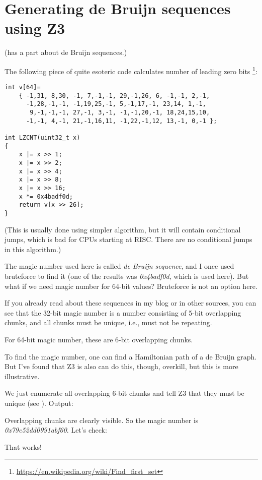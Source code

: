 \section{Generating de Bruijn sequences using Z3}
\label{DeBruijnZ3}

(\MathForProg has a part about de Bruijn sequences.)

\renewcommand{\CURPATH}{equations/de_bruijn_SMT}

The following piece of quite esoteric code calculates number of leading zero bits
\footnote{\url{https://en.wikipedia.org/wiki/Find_first_set}}:

\begin{lstlisting}
int v[64]=
	{ -1,31, 8,30, -1, 7,-1,-1, 29,-1,26, 6, -1,-1, 2,-1,
	  -1,28,-1,-1, -1,19,25,-1, 5,-1,17,-1, 23,14, 1,-1,
	   9,-1,-1,-1, 27,-1, 3,-1, -1,-1,20,-1, 18,24,15,10,
	  -1,-1, 4,-1, 21,-1,16,11, -1,22,-1,12, 13,-1, 0,-1 };

int LZCNT(uint32_t x)
{
    x |= x >> 1;
    x |= x >> 2;
    x |= x >> 4;
    x |= x >> 8;
    x |= x >> 16;
    x *= 0x4badf0d;
    return v[x >> 26];
}
\end{lstlisting}

(This is usually done using simpler algorithm, but it will contain conditional jumps, which is bad for
CPUs starting at RISC. There are no conditional jumps in this algorithm.)

The magic number used here is called \textit{de Bruijn sequence},
and I once used bruteforce to find it (one of the results was \textit{0x4badf0d}, which is used here).
But what if we need magic number for 64-bit values?
Bruteforce is not an option here.

If you already read about these sequences in my blog or in other sources,
you can see that the 32-bit magic number is a number consisting
of 5-bit overlapping chunks, and all chunks must be unique, i.e., must not be repeating.

For 64-bit magic number, these are 6-bit overlapping chunks.

To find the magic number, one can find a Hamiltonian path of a de Bruijn graph.
But I've found that Z3 is also can do this, though, overkill, but this is more illustrative.



We just enumerate all overlapping 6-bit chunks and tell Z3 that they must be unique (see ).
Output:



Overlapping chunks are clearly visible.
So the magic number is \textit{0x79c52dd0991abf60}.
Let's check:



That works!

